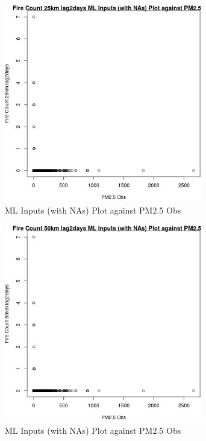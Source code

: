 \begin{figure} 
\centering  
\includegraphics[width=0.77\textwidth]{Code_Outputs/Report_ML_input_PM25_Step4_part_e_de_duplicated_aves_compiled_2019-05-20wNAs_Fire_Count_25km_lag2daysvPM25_Obs.jpg} 
\caption{\label{fig:Report_ML_input_PM25_Step4_part_e_de_duplicated_aves_compiled_2019-05-20wNAsFire_Count_25km_lag2daysvPM25_Obs}ML Inputs (with NAs) Plot against PM2.5 Obs} 
\end{figure} 
 

\clearpage 

\begin{figure} 
\centering  
\includegraphics[width=0.77\textwidth]{Code_Outputs/Report_ML_input_PM25_Step4_part_e_de_duplicated_aves_compiled_2019-05-20wNAs_Fire_Count_50km_lag2daysvPM25_Obs.jpg} 
\caption{\label{fig:Report_ML_input_PM25_Step4_part_e_de_duplicated_aves_compiled_2019-05-20wNAsFire_Count_50km_lag2daysvPM25_Obs}ML Inputs (with NAs) Plot against PM2.5 Obs} 
\end{figure} 
 

